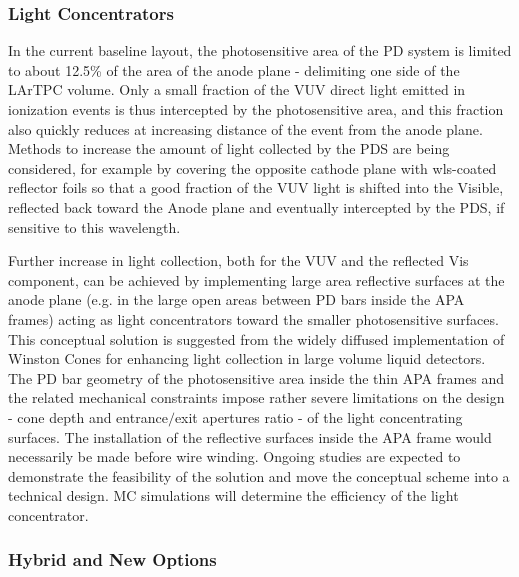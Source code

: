 \subsubsection{Light Concentrators}
\label{sec:fdsp-pd-assy-lc}
	
In the current baseline layout, the photosensitive area of the PD system is limited to about 12.5\% of the area of the anode plane - delimiting one side of the LArTPC volume. 
Only a small fraction of the VUV direct light emitted in ionization events is thus intercepted by the photosensitive area, and this fraction also quickly reduces at increasing distance of the event from the anode plane. \\
Methods to increase the amount of light collected by the PDS are being considered, for example by covering the opposite cathode plane with wls-coated reflector foils so that a good fraction of the VUV light is shifted into the Visible, reflected back toward the Anode plane and eventually intercepted by the PDS, if sensitive to this wavelength.

Further increase in light collection, both for the VUV and the reflected Vis component, can be achieved by implementing large area reflective surfaces at the anode plane (e.g. in the large open areas between PD bars inside the APA frames) acting as light concentrators toward the smaller photosensitive surfaces.  
This conceptual solution is suggested from the widely diffused implementation of Winston Cones for enhancing light collection in large volume liquid detectors. 
The PD bar geometry of the photosensitive area inside the thin APA frames and the related mechanical constraints impose rather severe limitations on the design - cone depth and entrance$/$exit apertures ratio - of the light concentrating surfaces. The installation of the reflective surfaces inside the APA frame would necessarily be made before wire winding. 
Ongoing studies are expected to demonstrate the feasibility of the solution and move the conceptual scheme into a technical design. MC simulations will determine the efficiency of the light concentrator. 




\subsubsection{Hybrid and New Options}

